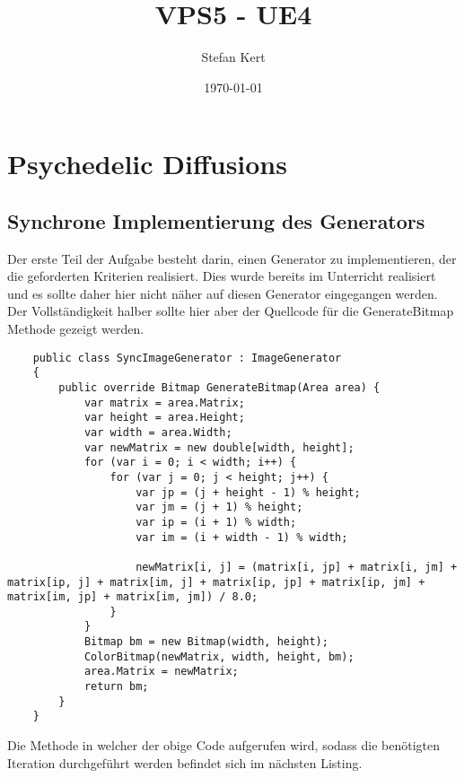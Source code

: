 \documentclass[a4paper,ngerman]{scrartcl}
\begin{document}
\title{VPS5 - UE4}
\author{Stefan Kert}
\date{\today}
\maketitle

\section{Psychedelic Diffusions}

\subsection{Synchrone Implementierung des Generators}
Der erste Teil der Aufgabe besteht darin, einen Generator zu implementieren, der die geforderten Kriterien realisiert. Dies wurde bereits im Unterricht realisiert und es sollte daher hier nicht näher auf diesen Generator eingegangen werden. Der Vollständigkeit halber sollte hier aber der Quellcode für die GenerateBitmap Methode gezeigt werden. 

\begin{lstlisting}
    public class SyncImageGenerator : ImageGenerator
    {
        public override Bitmap GenerateBitmap(Area area) {
            var matrix = area.Matrix;
            var height = area.Height;
            var width = area.Width;
            var newMatrix = new double[width, height];
            for (var i = 0; i < width; i++) {
                for (var j = 0; j < height; j++) {
                    var jp = (j + height - 1) % height;
                    var jm = (j + 1) % height;
                    var ip = (i + 1) % width;
                    var im = (i + width - 1) % width;

                    newMatrix[i, j] = (matrix[i, jp] + matrix[i, jm] + matrix[ip, j] + matrix[im, j] + matrix[ip, jp] + matrix[ip, jm] + matrix[im, jp] + matrix[im, jm]) / 8.0;
                }
            }
            Bitmap bm = new Bitmap(width, height);
            ColorBitmap(newMatrix, width, height, bm);
            area.Matrix = newMatrix;
            return bm;
        }
    }
\end{lstlisting}

Die Methode in welcher der obige Code aufgerufen wird, sodass die benötigten Iteration durchgeführt werden befindet sich im nächsten Listing.
\end{document}
